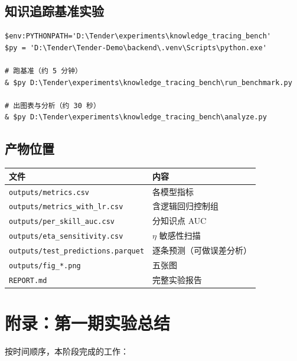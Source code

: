\documentclass[UTF8,a4paper,11pt]{ctexart}
\begin{document}
\subsection{知识追踪基准实验}

\begin{verbatim}
$env:PYTHONPATH='D:\Tender\experiments\knowledge_tracing_bench'
$py = 'D:\Tender\Tender-Demo\backend\.venv\Scripts\python.exe'

# 跑基准（约 5 分钟）
& $py D:\Tender\experiments\knowledge_tracing_bench\run_benchmark.py

# 出图表与分析（约 30 秒）
& $py D:\Tender\experiments\knowledge_tracing_bench\analyze.py
\end{verbatim}

\subsection{产物位置}

\begin{longtable}{@{}p{8.0cm}p{5.6cm}@{}}
\toprule
\textbf{文件} & \textbf{内容} \\
\midrule
\texttt{outputs/metrics.csv} & 各模型指标 \\
\texttt{outputs/metrics\_with\_lr.csv} & 含逻辑回归控制组 \\
\texttt{outputs/per\_skill\_auc.csv} & 分知识点 AUC \\
\texttt{outputs/eta\_sensitivity.csv} & $\eta$ 敏感性扫描 \\
\texttt{outputs/test\_predictions.parquet} & 逐条预测（可做误差分析） \\
\texttt{outputs/fig\_*.png} & 五张图 \\
\texttt{REPORT.md} & 完整实验报告 \\
\bottomrule
\end{longtable}

\newpage


\section{附录：第一期实验总结}

按时间顺序，本阶段完成的工作：
\end{document}
